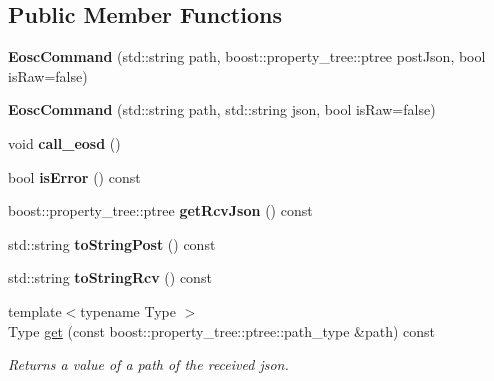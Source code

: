 \subsection*{Public Member Functions}
\begin{DoxyCompactItemize}
\item 
\mbox{\label{classtokenika_1_1eosc_1_1_eosc_command_ab736f0dcd8ca14eb0daf9b2244218397}} 
{\bfseries Eosc\+Command} (std\+::string path, boost\+::property\+\_\+tree\+::ptree post\+Json, bool is\+Raw=false)
\item 
\mbox{\label{classtokenika_1_1eosc_1_1_eosc_command_ac9db6f0741086143353cdecb49e496dd}} 
{\bfseries Eosc\+Command} (std\+::string path, std\+::string json, bool is\+Raw=false)
\item 
\mbox{\label{classtokenika_1_1eosc_1_1_eosc_command_aa26a8e34b790074bb0a87b6fe82c29cb}} 
void {\bfseries call\+\_\+eosd} ()
\item 
\mbox{\label{classtokenika_1_1eosc_1_1_eosc_command_a63f3adace3f84b59f64c5a54ca0c18dc}} 
bool {\bfseries is\+Error} () const
\item 
\mbox{\label{classtokenika_1_1eosc_1_1_eosc_command_a2b451aefc95258d481cff16747fa1888}} 
boost\+::property\+\_\+tree\+::ptree {\bfseries get\+Rcv\+Json} () const
\item 
\mbox{\label{classtokenika_1_1eosc_1_1_eosc_command_a1cb0362dceb5999e7e06078223b20d91}} 
std\+::string {\bfseries to\+String\+Post} () const
\item 
\mbox{\label{classtokenika_1_1eosc_1_1_eosc_command_ad01ef46444d9d8bc708b5d18605c3903}} 
std\+::string {\bfseries to\+String\+Rcv} () const
\item 
{\footnotesize template$<$typename Type $>$ }\\Type \hyperlink{classtokenika_1_1eosc_1_1_eosc_command_aa1da6eb23f52159afa4a15e767cd7d6f}{get} (const boost\+::property\+\_\+tree\+::ptree\+::path\+\_\+type \&path) const
\begin{DoxyCompactList}\small\item\em Returns a value of a path of the received json. \end{DoxyCompactList}\end{DoxyCompactItemize}
